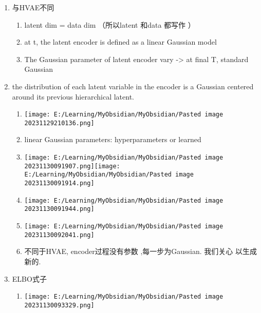 \documentclass[
]{article}
\providecommand{\tightlist}{%
  \setlength{\itemsep}{0pt}\setlength{\parskip}{0pt}}
\begin{document}
\begin{enumerate}
\tightlist
\item
  与HVAE不同

  \begin{enumerate}
  \tightlist
  \item
    latent dim = data dim （所以latent 和data 都写作{} ）
  \item
    at t, the latent encoder is defined as a linear Gaussian model
  \item
    The Gaussian parameter of latent encoder vary -\textgreater{} at
    final T, standard Gaussian
  \end{enumerate}
\item
  the distribution of each latent variable in the encoder is a Gaussian
  centered around its previous hierarchical latent.

  \begin{enumerate}
  \tightlist
  \item
    \texttt{[image: E:/Learning/MyObsidian/MyObsidian/Pasted image 20231129210136.png]}
  \item
    linear Gaussian parameters: hyperparameters or learned
  \item
    \texttt{[image: E:/Learning/MyObsidian/MyObsidian/Pasted image 20231130091907.png]}\texttt{[image: E:/Learning/MyObsidian/MyObsidian/Pasted image 20231130091914.png]}
  \item
    \texttt{[image: E:/Learning/MyObsidian/MyObsidian/Pasted image 20231130091944.png]}
  \item
    \texttt{[image: E:/Learning/MyObsidian/MyObsidian/Pasted image 20231130092041.png]}
  \item
    不同于HVAE, encoder过程没有参数 {} ,每一步为Gaussian. 我们关心 {}
    以生成新的{}.
  \end{enumerate}
\item
  ELBO式子

  \begin{enumerate}
  \tightlist
  \item
    \texttt{[image: E:/Learning/MyObsidian/MyObsidian/Pasted image 20231130093329.png]}


\end{enumerate}
\end{enumerate}
\end{document}
